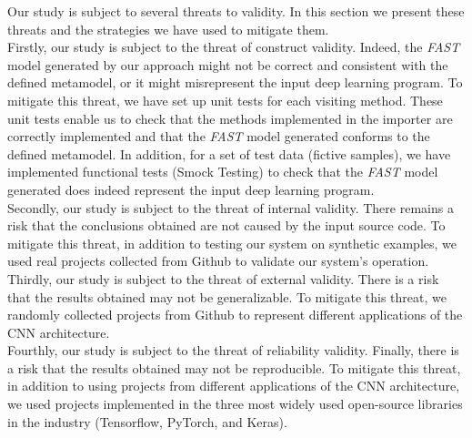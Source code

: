 \label{sec:threats}
Our study is subject to several threats to validity. In this section we present these threats and the strategies we have used to mitigate them.\\

Firstly, our study is subject to the threat of construct validity. Indeed, the \emph{FAST} model generated by our approach might not be correct and consistent with the defined metamodel, or it might misrepresent the input deep learning program. To mitigate this threat, we have set up unit tests for each visiting method. These unit tests enable us to check that the methods implemented in the importer are correctly implemented and that the \emph{FAST} model generated conforms to the defined metamodel. In addition, for a set of test data (fictive samples), we have implemented functional tests (Smock Testing) to check that the \emph{FAST} model generated does indeed represent the input deep learning program.\\

Secondly, our study is subject to the threat of internal validity. There remains a risk that the conclusions obtained are not caused by the input source code. To mitigate this threat, in addition to testing our system on synthetic examples, we used real projects collected from Github to validate our system's operation.\\

Thirdly, our study is subject to the threat of external validity. There is a risk that the results obtained may not be generalizable. To mitigate this threat, we randomly collected projects from Github to represent different applications of the CNN architecture.\\

Fourthly, our study is subject to the threat of reliability validity. Finally, there is a risk that the results obtained may not be reproducible. To mitigate this threat, in addition to using projects from different applications of the CNN architecture, we used projects implemented in the three most widely used open-source libraries in the industry (Tensorflow, PyTorch, and Keras).